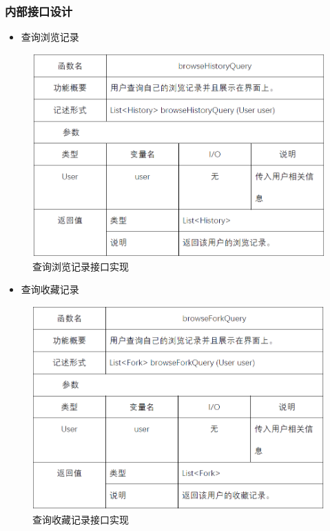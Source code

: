 \subsubsection{内部接口设计}
\begin{itemize}
	\item 查询浏览记录
\end{itemize}
\begin{figure}[!htbp]
	\centering
	\includegraphics[scale=0.7]{image/b11.png} %
	\caption{查询浏览记录接口实现} %
\end{figure}
\begin{itemize}
	\item 查询收藏记录
\end{itemize}
\begin{figure}[!htbp]
	\centering
	\includegraphics[scale=0.7]{image/b12.png} %
	\caption{查询收藏记录接口实现} %
\end{figure}
